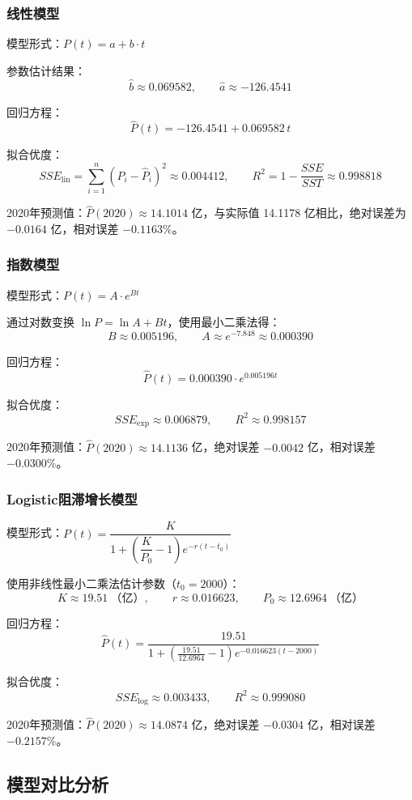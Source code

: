 \documentclass{article}
\begin{document}
	\subsubsection{线性模型}
	模型形式：$P(t) = a + b \cdot t$
	
	参数估计结果：
	\[
	\hat{b} \approx 0.069582,\qquad \hat{a} \approx -126.4541
	\]
	
	回归方程：
	\[
	\hat{P}(t) = -126.4541 + 0.069582\,t
	\]
	
	拟合优度：
	\[
	SSE_{\text{lin}} = \sum_{i=1}^n (P_i - \hat{P}_i)^2 \approx 0.004412,\qquad R^2 = 1 - \frac{SSE}{SST} \approx 0.998818
	\]
	
	2020年预测值：$\hat{P}(2020) \approx 14.1014$ 亿，与实际值 14.1178 亿相比，绝对误差为 $-0.0164$ 亿，相对误差 $-0.1163\%$。
	
	\subsubsection{指数模型}
	模型形式：$P(t) = A \cdot e^{B t}$
	
	通过对数变换 $\ln P = \ln A + B t$，使用最小二乘法得：
	\[
	B \approx 0.005196,\qquad A \approx e^{-7.848} \approx 0.000390
	\]
	
	回归方程：
	\[
	\hat{P}(t) = 0.000390 \cdot e^{0.005196 t}
	\]
	
	拟合优度：
	\[
	SSE_{\text{exp}} \approx 0.006879,\qquad R^2 \approx 0.998157
	\]
	
	2020年预测值：$\hat{P}(2020) \approx 14.1136$ 亿，绝对误差 $-0.0042$ 亿，相对误差 $-0.0300\%$。
	
	\subsubsection{Logistic阻滞增长模型}
	模型形式：$P(t) = \dfrac{K}{1 + \left(\dfrac{K}{P_0} - 1\right)e^{-r(t-t_0)}}$
	
	使用非线性最小二乘法估计参数（$t_0 = 2000$）：
	\[
	K \approx 19.51\ \text{（亿）},\qquad r \approx 0.016623,\qquad P_0 \approx 12.6964\ \text{（亿）}
	\]
	
	回归方程：
	\[
	\hat{P}(t) = \frac{19.51}{1 + \left(\frac{19.51}{12.6964} - 1\right)e^{-0.016623(t-2000)}}
	\]
	
	拟合优度：
	\[
	SSE_{\text{log}} \approx 0.003433,\qquad R^2 \approx 0.999080
	\]
	
	2020年预测值：$\hat{P}(2020) \approx 14.0874$ 亿，绝对误差 $-0.0304$ 亿，相对误差 $-0.2157\%$。
	
	\subsection{模型对比分析}
	
\end{document}
